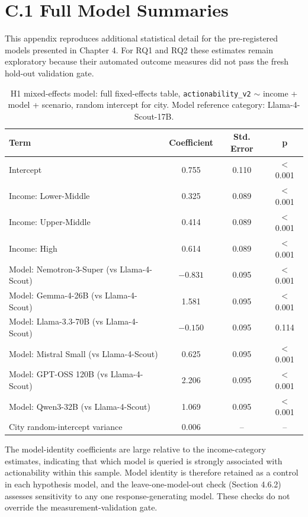 \section*{C.1 Full Model Summaries}

This appendix reproduces additional statistical detail for the pre-registered models presented in Chapter 4. For RQ1 and RQ2 these estimates remain exploratory because their automated outcome measures did not pass the fresh hold-out validation gate.

\begin{table}[H]
\centering
\caption{H1 mixed-effects model: full fixed-effects table, \texttt{actionability\_v2} $\sim$ income + model + scenario, random intercept for city. Model reference category: Llama-4-Scout-17B.}
\begin{tabular}{lccc}
\toprule
Term & Coefficient & Std. Error & p \\
\midrule
Intercept & 0.755 & 0.110 & $<$0.001 \\
Income: Lower-Middle & 0.325 & 0.089 & $<$0.001 \\
Income: Upper-Middle & 0.414 & 0.089 & $<$0.001 \\
Income: High & 0.614 & 0.089 & $<$0.001 \\
Model: Nemotron-3-Super (vs Llama-4-Scout) & $-0.831$ & 0.095 & $<$0.001 \\
Model: Gemma-4-26B (vs Llama-4-Scout) & 1.581 & 0.095 & $<$0.001 \\
Model: Llama-3.3-70B (vs Llama-4-Scout) & $-0.150$ & 0.095 & 0.114 \\
Model: Mistral Small (vs Llama-4-Scout) & 0.625 & 0.095 & $<$0.001 \\
Model: GPT-OSS 120B (vs Llama-4-Scout) & 2.206 & 0.095 & $<$0.001 \\
Model: Qwen3-32B (vs Llama-4-Scout) & 1.069 & 0.095 & $<$0.001 \\
City random-intercept variance & 0.006 & -- & -- \\
\bottomrule
\end{tabular}
\end{table}

The model-identity coefficients are large relative to the income-category estimates, indicating that which model is queried is strongly associated with actionability within this sample. Model identity is therefore retained as a control in each hypothesis model, and the leave-one-model-out check (Section 4.6.2) assesses sensitivity to any one response-generating model. These checks do not override the measurement-validation gate.

